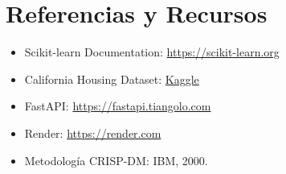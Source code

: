 \documentclass[11pt,a4paper]{article}
\begin{document}
\section{Referencias y Recursos}

\begin{itemize}
  \item Scikit-learn Documentation: \href{https://scikit-learn.org}{https://scikit-learn.org}
  \item California Housing Dataset: \href{https://www.kaggle.com/datasets/camnugent/california-housing-prices}{Kaggle}
  \item FastAPI: \href{https://fastapi.tiangolo.com}{https://fastapi.tiangolo.com}
  \item Render: \href{https://render.com}{https://render.com}
  \item Metodología CRISP-DM: IBM, 2000.
\end{itemize}
\end{document}
